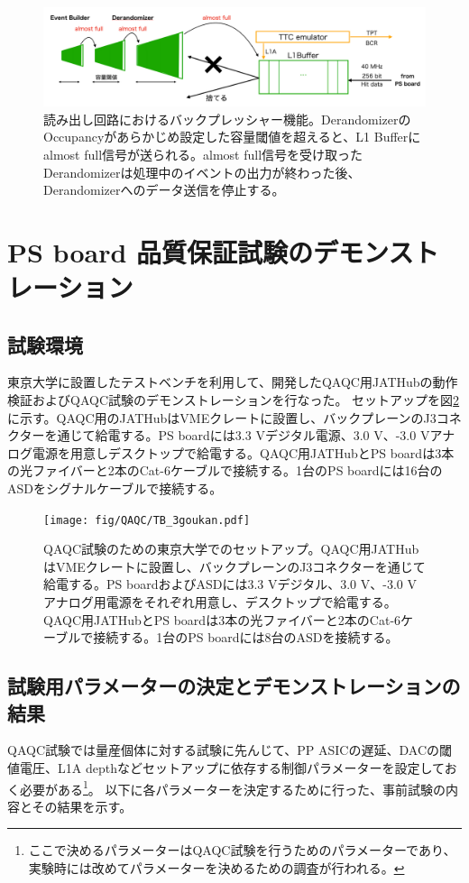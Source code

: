 \begin{figure} 
\centering
\includegraphics[width=16cm]{fig/QAQC/JATHubbackpressure.png}
\caption[リードアウト回路におけるバックプレッシャー機能]{読み出し回路におけるバックプレッシャー機能。DerandomizerのOccupancyがあらかじめ設定した容量閾値を超えると、L1 Bufferにalmost full信号が送られる。almost full信号を受け取ったDerandomizerは処理中のイベントの出力が終わった後、Derandomizerへのデータ送信を停止する。}
\label{JATHubbackpressure}
\end{figure}

\clearpage
\section{PS board 品質保証試験のデモンストレーション}
\label{sec_PSboardQAQCdemo}

\subsection{試験環境}
\label{subsec_testenv}
東京大学に設置したテストベンチを利用して、開発したQAQC用JATHubの動作検証およびQAQC試験のデモンストレーションを行なった。
セットアップを図\ref{QAQCsetup}に示す。QAQC用のJATHubはVMEクレートに設置し、バックプレーンのJ3コネクターを通じて給電する。PS boardには3.3 Vデジタル電源、3.0 V、-3.0 Vアナログ電源を用意しデスクトップで給電する。QAQC用JATHubとPS boardは3本の光ファイバーと2本のCat-6ケーブルで接続する。1台のPS boardには16台のASDをシグナルケーブルで接続する。

\begin{figure} 
\centering
\texttt{[image: fig/QAQC/TB\_3goukan.pdf]}
\caption[]{QAQC試験のための東京大学でのセットアップ。QAQC用JATHubはVMEクレートに設置し、バックプレーンのJ3コネクターを通じて給電する。PS boardおよびASDには3.3 Vデジタル、3.0 V、-3.0 Vアナログ用電源をそれぞれ用意し、デスクトップで給電する。QAQC用JATHubとPS boardは3本の光ファイバーと2本のCat-6ケーブルで接続する。1台のPS boardには8台のASDを接続する。}
\label{QAQCsetup}
\end{figure}


\subsection{試験用パラメーターの決定とデモンストレーションの結果}
\label{subsec_tb_result}
QAQC試験では量産個体に対する試験に先んじて、PP ASICの遅延、DACの閾値電圧、L1A depthなどセットアップに依存する制御パラメーターを設定しておく必要がある\footnote{ここで決めるパラメーターはQAQC試験を行うためのパラメーターであり、実験時には改めてパラメーターを決めるための調査が行われる。}。
以下に各パラメーターを決定するために行った、事前試験の内容とその結果を示す。

